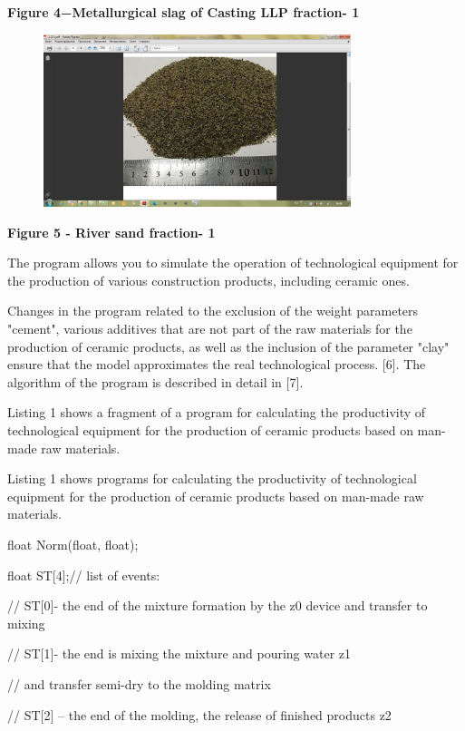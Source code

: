 {\bfseries Figure 4−Metallurgical slag of Casting LLP fraction- 1}

\begin{figure}[H]
	\centering
	\includegraphics[width=0.8\textwidth]{assets/271}
	\caption*{}
\end{figure}

{\bfseries Figure 5 - River sand fraction- 1}

The program allows you to simulate the operation of technological
equipment for the production of various construction products, including
ceramic ones.

Changes in the program related to the exclusion of the weight parameters
"cement", various additives that are not part of the raw materials for
the production of ceramic products, as well as the inclusion of the
parameter "clay" ensure that the model approximates the real
technological process. {[}6{]}. The algorithm of the program is
described in detail in {[}7{]}.

Listing 1 shows a fragment of a program for calculating the productivity
of technological equipment for the production of ceramic products based
on man-made raw materials.

Listing 1 shows programs for calculating the productivity of
technological equipment for the production of ceramic products based on
man-made raw materials.

float Norm(float, float);

float ST{[}4{]};// list of events:

// ST{[}0{]}- the end of the mixture formation by the z0 device and
transfer to mixing

// ST{[}1{]}- the end is mixing the mixture and pouring water z1

// and transfer semi-dry to the molding matrix

// ST{[}2{]} -- the end of the molding, the release of finished products
z2

